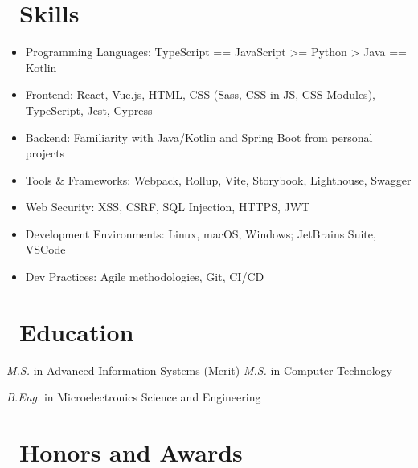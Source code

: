\documentclass{resume}
\begin{document}

\section{\faCogs\ Skills}
\begin{itemize}[parsep=0.5ex]
  \item Programming Languages: TypeScript == JavaScript >= Python > Java == Kotlin
  \item Frontend: React, Vue.js, HTML, CSS (Sass, CSS-in-JS, CSS Modules), TypeScript, Jest, Cypress
  \item Backend: Familiarity with Java/Kotlin and Spring Boot from personal projects
  \item Tools \& Frameworks: Webpack, Rollup, Vite, Storybook, Lighthouse, Swagger
  \item Web Security: XSS, CSRF, SQL Injection, HTTPS, JWT
  \item Development Environments: Linux, macOS, Windows; JetBrains Suite, VSCode
  \item Dev Practices: Agile methodologies, Git, CI/CD
\end{itemize}

\section{\faGraduationCap\ Education}
\textit{M.S.} in Advanced Information Systems (Merit)
\textit{M.S.} in Computer Technology

\textit{B.Eng.} in Microelectronics Science and Engineering

\section{\faHeartO\ Honors and Awards}
\end{document}

